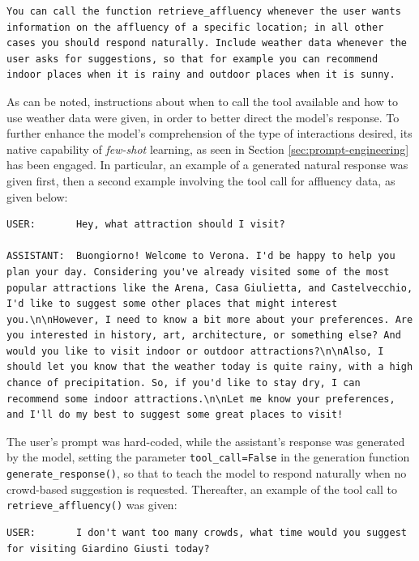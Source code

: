 \begin{Verbatim}[breaklines=true]
You can call the function retrieve_affluency whenever the user wants information on the affluency of a specific location; in all other cases you should respond naturally. Include weather data whenever the user asks for suggestions, so that for example you can recommend indoor places when it is rainy and outdoor places when it is sunny.
\end{Verbatim}

As can be noted, instructions about when to call the tool available and how to use weather data were given, in order to better direct the model's response. To further enhance the model's comprehension of the type of interactions desired, its native capability of \textit{few-shot} learning, as seen in Section \ref{sec:prompt-engineering} has been engaged. In particular, an example of a generated natural response was given first, then a second example involving the tool call for affluency data, as given below:

\begin{Verbatim}[breaklines=true]
USER:       Hey, what attraction should I visit?

ASSISTANT:  Buongiorno! Welcome to Verona. I'd be happy to help you plan your day. Considering you've already visited some of the most popular attractions like the Arena, Casa Giulietta, and Castelvecchio, I'd like to suggest some other places that might interest you.\n\nHowever, I need to know a bit more about your preferences. Are you interested in history, art, architecture, or something else? And would you like to visit indoor or outdoor attractions?\n\nAlso, I should let you know that the weather today is quite rainy, with a high chance of precipitation. So, if you'd like to stay dry, I can recommend some indoor attractions.\n\nLet me know your preferences, and I'll do my best to suggest some great places to visit!
\end{Verbatim}

The user's prompt was hard-coded, while the assistant's response was generated by the model, setting the parameter \texttt{tool\_call=False} in the generation function \texttt{generate\_response()}, so that to teach the model to respond naturally when no crowd-based suggestion is requested. Thereafter, an example of the tool call to \texttt{retrieve\_affluency()} was given:

\begin{Verbatim}[breaklines=true]
USER:       I don't want too many crowds, what time would you suggest for visiting Giardino Giusti today?
\end{Verbatim}

